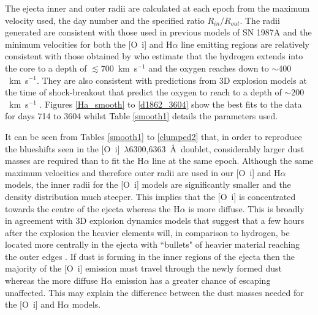 \documentclass[useAMS,usenatbib,usegraphicx]{mnras}
\begin{document}
The ejecta inner and outer radii are calculated at each epoch from the maximum 
velocity used, the day number and the specified ratio $R_{in}/R_{out}$.  
The radii generated are consistent with those used in previous models of 
SN 1987A \citep{Ercolano2007, Wesson2015} and the minimum velocities for both the [O~{\sc i}] and H$\alpha$ line emitting regions are relatively consistent with those obtained by \citet{Kozma1998} who estimate that the hydrogen extends into the core to a depth of $\lesssim 700$~km~s$^{-1}$ and the oxygen reaches down to $\sim 400$~km~s$^{-1}$.  They are also consistent with predictions from 3D explosion models at the time of shock-breakout that predict the oxygen to reach to a depth of $\sim 200$~km~s$^{-1}$ \citep{Hammer2010,Wongwathanarat2015}.
Figures \ref{Ha_smooth} to 
\ref{d1862_3604} show the best fits to the data for days 714 to 3604 whilst 
Table \ref{smooth1} details the parameters used.

It can be seen from Tables \ref{smooth1} to \ref{clumped2} that, in order to reproduce the blueshifts seen in the 
[O~{\sc i}]~$\lambda$6300,6363~\AA\ doublet, considerably larger dust masses 
are required than to fit the H$\alpha$ line at the same epoch.  Although the same maximum velocities and therefore outer radii are used in our [O~{\sc i}] and H$\alpha$ models, the inner radii for the [O~{\sc i}] models are significantly smaller and the density distribution much steeper.  This implies that the [O~{\sc i}] is concentrated towards the centre of the ejecta whereas the H$\alpha$ is more diffuse.  This is broadly in agreement with 3D explosion dynamics models that suggest that a few hours after the explosion the heavier elements will, in comparison to hydrogen, be located more centrally in the ejecta with ``bullets" of heavier material reaching the outer edges  \citep{Hammer2010}.  If dust is forming in the inner regions of the ejecta then the majority of the  [O~{\sc i}] emission must travel through the newly formed dust whereas the more diffuse H$\alpha$ emission has a greater chance of escaping unaffected.  This may explain the difference between the dust masses needed for the [O~{\sc i}] and H$\alpha$ models.


\end{document}
